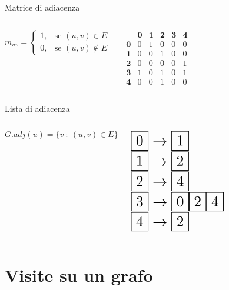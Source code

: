\documentclass[compress]{beamer}
\newcommand\scalemath[2]{\scalebox{#1}{\mbox{\ensuremath{\displaystyle #2}}}}
\begin{document}
\begin{frame}{Matrice di adiacenza}
  \begin{columns}
    \[
    m_{uv} = \begin{cases}
      1, & \text{se $(u,v) \in E$} \\
      0, & \text{se $(u,v) \notin E$}
    \end{cases}
    \]
    
    \[
    \begin{matrix}
       & \textbf{0} & \textbf{1} & \textbf{2} & \textbf{3} & \textbf{4} \\
      \textbf{0} & 0 & 1 & 0 & 0 & 0 \\
      \textbf{1} & 0 & 0 & 1 & 0 & 0 \\
      \textbf{2} & 0 & 0 & 0 & 0 & 1 \\
      \textbf{3} & 1 & 0 & 1 & 0 & 1 \\
      \textbf{4} & 0 & 0 & 1 & 0 & 0
    \end{matrix}
    \]
  \end{columns}
\end{frame}

\begin{frame}{Lista di adiacenza}
  \begin{columns}
  \[G.adj(u) = \{v \ : \ (u,v) \in E\}\]
  
  $\scalemath{1.8}{\fbox{0} \rightarrow \fbox{1}}$ \\
  $\scalemath{1.8}{\fbox{1} \rightarrow \fbox{2}}$ \\
  $\scalemath{1.8}{\fbox{2} \rightarrow \fbox{4}}$ \\
  $\scalemath{1.8}{\fbox{3} \rightarrow \fbox{0}\fbox{2}\fbox{4}}$ \\
  $\scalemath{1.8}{\fbox{4} \rightarrow \fbox{2}}$
  \end{columns}
\end{frame}

\section{Visite su un grafo}
\end{document}
